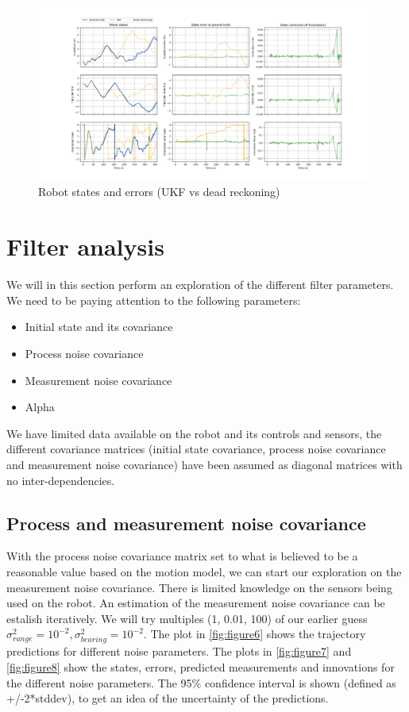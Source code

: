 \documentclass{article}
\begin{document}
\begin{figure}
\centering
\includegraphics[width=\textwidth]{Figure_5.png}
\caption{Robot states and errors (UKF vs dead reckoning)}
\end{figure}

\section{Filter analysis}
We will in this section perform an exploration of the different filter parameters. We need to be paying attention to the following parameters:
\begin{itemize}
      \item Initial state and its covariance
      \item Process noise covariance
      \item Measurement noise covariance
      \item Alpha
\end{itemize}

We have limited data available on the robot and its controls and sensors, the different covariance matrices (initial state covariance, process noise covariance and measurement noise covariance) have been assumed as diagonal matrices with no inter-dependencies.


\subsection{Process and measurement noise covariance}
With the process noise covariance matrix set to what is believed to be a reasonable value based on the motion model, we can start our exploration on the measurement noise covariance. There is limited knowledge on the sensors being used on the robot.
An estimation of the measurement noise covariance can be estalish iteratively. We will try multiples (1, 0.01, 100) of our earlier guess $\sigma_{range}^2=10^{-2}, \sigma_{bearing}^2=10^{-2}$. The plot in \autoref{fig:figure6} shows the trajectory predictions for different noise parameters. The plots in \autoref{fig:figure7} and \autoref{fig:figure8} show the states, errors, predicted measurements and innovations for the different noise parameters. The 95\% confidence interval is shown (defined as +/-2*stddev), to get an idea of the uncertainty of the predictions.
\end{document}
